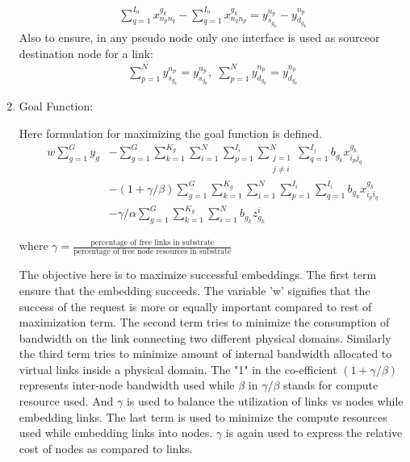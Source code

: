 \documentclass[article,dr=phil,type=msc ,colorback,accentcolor=tud4b]{tudthesis}
\begin{document}
\begin{enumerate}[label=(\Alph*)]
\begin{equation}
\begin{split}
 \sum_{q=1}^{I_{n}} x^{g_{k}}_{n_{p}n_{q}} -  \sum_{q=1}^{I_{n}} x^{g_{k}}_{n_{q}n_{p}} = y_{s_{g_{k}}}^{n_{p}} - y_{d_{g_{k}}}^{n_{p}} 
\end{split}
\end{equation}
Also to ensure, in any pseudo node only one interface is used as sourceor destination node for a link:
\begin{equation} \label{tec1}
\begin{split}
\sum_{p=1}^{N} y_{s_{g_{k}}}^{n_{p}} = y_{s_{g_{k}}}^{n_{p}}, \; \sum_{p=1}^{N} y_{d_{g_{k}}}^{n_{p}} = y_{d_{g_{k}}}^{n_{p}}
\end{split}
\end{equation}
\item Goal Function:

Here formulation for maximizing the goal function is defined.
\begin{equation}
\begin{aligned}
w\sum_{g=1}^{G} y_{g} &- \sum_{g=1}^{G} \sum_{k=1}^{K_{g}}  \sum_{i=1}^{N} \sum_{p=1}^{I_{i}} \sum_{\substack{j=1 \\ j\neq i}}^{N} \sum_{q=1}^{I_{j}} b_{g_{k}}  x^{g_{k}}_{i_{p}j_{q}}\\ &- (1+\gamma/\beta) \sum_{g=1}^{G} \sum_{k=1}^{K_{g}}  \sum_{i=1}^{N} \sum_{p=1}^{I_{i}} \sum_{q=1}^{I_{i}} b_{g_{k}}  x^{g_{k}}_{i_{p}i_{q}}\\ &- \gamma/\alpha \sum_{g=1}^{G} \sum_{k=1}^{K_{g}}  \sum_{i=1}^{N} b_{g_{k}} z_{g_{k}}^{i} 
\end{aligned}
\end{equation}

where $\gamma = \frac{\text{percentage of free links in substrate}}{\text{percentage of free node resources in substrate}}$ \newline

The objective here is to maximize successful embeddings. The first term ensure that the embedding succeeds. The variable 'w' signifies that the success of the request is more or equally important compared to rest of maximization term. The second term tries to minimize the consumption of bandwidth on the link connecting two different physical domains. Similarly the third term tries to minimize amount of internal bandwidth allocated to virtual links inside a physical domain. The "1" in the co-efficient $(1+\gamma/\beta)$ represents inter-node bandwidth used while $\beta$ in $\gamma/\beta$ stands for compute resource used. And $\gamma$ is used to balance the utilization of links vs nodes while embedding links. The last term is used to minimize the compute
resources used while embedding links into nodes. $\gamma$ is again used to express the relative cost of nodes as compared to links.
\end{enumerate}
\end{document}
